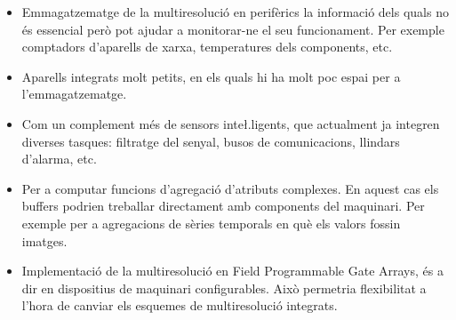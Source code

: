 \begin{itemize}
\item Emmagatzematge de la multiresolució en perifèrics la informació
  dels quals no és essencial però pot ajudar a monitorar-ne el seu
  funcionament. Per exemple comptadors d'aparells de xarxa,
  temperatures dels components, etc.

\item Aparells integrats molt petits, en els quals hi ha molt poc
  espai per a l'emmagatzematge. %

\item Com un complement més de sensors inte\l.ligents, que actualment
  ja integren diverses tasques: filtratge del senyal, busos de
  comunicacions, llindars d'alarma, etc.


\item Per a computar funcions d'agregació d'atributs complexes. En
  aquest cas els buffers podrien treballar directament amb components
  del maquinari. Per exemple per a agregacions de sèries temporals en
  què els valors fossin imatges.

\item Implementació de la multiresolució en Field Programmable Gate
  Arrays, és a dir en dispositius de maquinari configurables. Això
  permetria flexibilitat a l'hora de canviar els esquemes de
  multiresolució integrats.



\end{itemize}

















